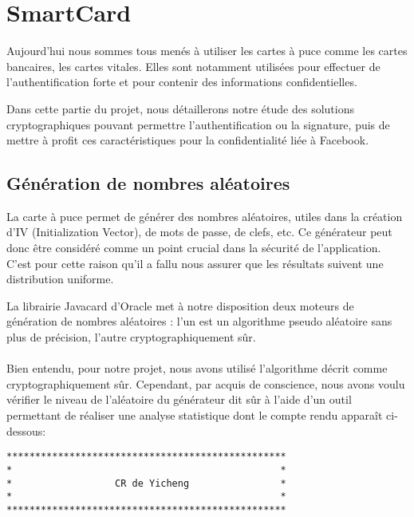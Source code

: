 \documentclass[a4paper,11pt,french]{article}
\begin{document}
\section{SmartCard}
Aujourd'hui nous sommes tous menés à utiliser les cartes à puce comme les cartes
bancaires, les cartes vitales. Elles sont notamment utilisées pour effectuer de 
l'authentification forte et pour contenir des informations confidentielles.

Dans cette partie du projet, nous détaillerons notre étude des solutions 
cryptographiques pouvant permettre l'authentification ou la signature, puis de 
mettre à profit ces caractéristiques pour la confidentialité liée à Facebook.


\subsection{Génération de nombres aléatoires}
La carte à puce permet de générer des nombres aléatoires, utiles dans la création
d'IV (Initialization Vector), de mots de passe, de clefs, etc. Ce générateur 
peut donc être considéré comme un point crucial dans la sécurité de l'application.
C'est pour cette raison qu'il a fallu nous assurer que les résultats suivent une
distribution uniforme. 

La librairie Javacard d'Oracle met à notre disposition deux moteurs de génération
de nombres aléatoires : l'un est un algorithme pseudo aléatoire sans plus de précision, l'autre 
cryptographiquement sûr.

\paragraph{}
Bien entendu, pour notre projet, nous avons utilisé l'algorithme décrit comme 
\og{}cryptographiquement sûr\fg{}. Cependant, par acquis de conscience, nous avons voulu
vérifier le niveau de l'aléatoire du générateur dit sûr à l'aide d'un
outil permettant de réaliser une analyse statistique dont le compte rendu
apparaît ci-dessous:

\begin{verbatim}
*************************************************
*                                               *
*                  CR de Yicheng                *
*                                               *
*************************************************
\end{verbatim}

\end{document}
